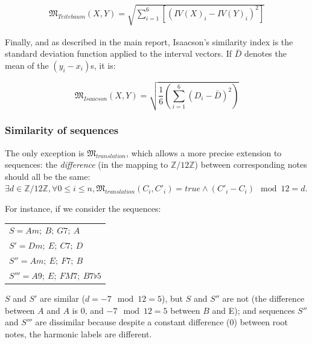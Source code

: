 \documentclass[a4paper,10pt]{article}
\begin{document}
\begin{align*}
\mathfrak{M}_{Teitebaum}(X,Y) = \sqrt{\sum_{i=1}^6 \left[(IV(X)_i-IV(Y)_i)^2\right]}
\end{align*}

Finally, and as described in the main report, Isaacson's similarity index is the standard deviation function applied to the interval vectors. If $\bar{D}$ denotes the mean of the $(y_i-x_i)$s, it is:

\begin{equation*}
\mathfrak{M}_{Isaacson}(X,Y) = \sqrt{\frac{1}{6}\left(\sum_{i=1}^6\left(D_i-\bar{D}\right)^2\right)}
\end{equation*}

\subsubsection*{Similarity of sequences}


The only exception is $\mathfrak{M}_{translation}$, which allows a more precise extension to sequences: the \emph{difference} (in the mapping to $\mathbb{Z}/12\mathbb{Z}$) between corresponding notes should all be the same: $\exists d \in \mathbb{Z}/12\mathbb{Z}, \forall 0\leq i\leq n, \mathfrak{M}_{translation}(C_i,C'_i) = true \wedge (C'_i-C_i)\mod12 = d$.

For instance, if we consider the sequences:

\begin{center}
\begin{tabular}{l}
$S = Am;~B;~G7;~A$ \\
$S' = Dm;~E;~C7;~D$ \\
$S'' = Am;~E;~F7;~B$ \\
$S''' = A9;~E;~FM7;~B7\flat5$ \\
\end{tabular}
\end{center}

$S$ and $S'$ are similar ($d=-7\mod12=5$), but $S$ and $S''$ are not (the difference between $A$ and $A$ is $0$, and $-7\mod12=5$ between $B$ and E); and sequences $S''$ and $S'''$ are dissimilar because despite a constant difference ($0$) between root notes, the harmonic labels are different.
\end{document}
